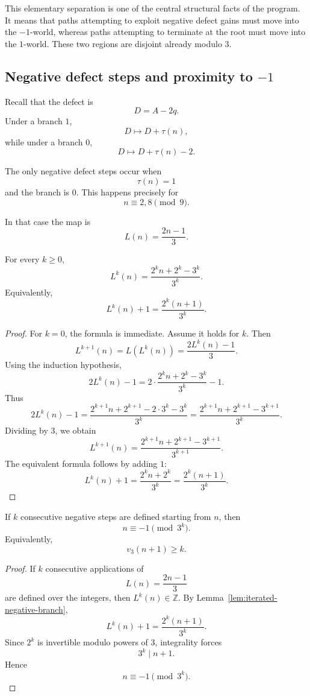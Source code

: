 This elementary separation is one of the central structural facts of the
program. It means that paths attempting to exploit negative defect gains
must move into the \(-1\)-world, whereas paths attempting to terminate at
the root must move into the \(1\)-world. These two regions are disjoint
already modulo \(3\).

\subsection{Negative defect steps and proximity to \(-1\)}
\label{subsec:negative-runs}

Recall that the defect is
\[
D=A-2q.
\]
Under a branch \(1\),
\[
D\mapsto D+\tau(n),
\]
while under a branch \(0\),
\[
D\mapsto D+\tau(n)-2.
\]

The only negative defect steps occur when
\[
\tau(n)=1
\]
and the branch is \(0\). This happens precisely for
\[
n\equiv2,8\pmod9.
\]

In that case the map is
\[
L(n)=\frac{2n-1}{3}.
\]

\begin{lemma}
\label{lem:iterated-negative-branch}
For every \(k\ge0\),
\[
L^k(n)
=
\frac{2^k n+2^k-3^k}{3^k}.
\]
Equivalently,
\[
L^k(n)+1
=
\frac{2^k(n+1)}{3^k}.
\]
\end{lemma}

\begin{proof}
For \(k=0\), the formula is immediate. Assume it holds for \(k\). Then
\[
L^{k+1}(n)
=
L(L^k(n))
=
\frac{2L^k(n)-1}{3}.
\]
Using the induction hypothesis,
\[
2L^k(n)-1
=
2\cdot
\frac{2^k n+2^k-3^k}{3^k}
-1.
\]
Thus
\[
2L^k(n)-1
=
\frac{2^{k+1}n+2^{k+1}-2\cdot3^k-3^k}{3^k}
=
\frac{2^{k+1}n+2^{k+1}-3^{k+1}}{3^k}.
\]
Dividing by \(3\), we obtain
\[
L^{k+1}(n)
=
\frac{2^{k+1}n+2^{k+1}-3^{k+1}}{3^{k+1}}.
\]
The equivalent formula follows by adding \(1\):
\[
L^k(n)+1
=
\frac{2^k n+2^k}{3^k}
=
\frac{2^k(n+1)}{3^k}.
\]
\end{proof}

\begin{lemma}
\label{lem:negative-runs-force-minus-one}
If \(k\) consecutive negative steps are defined starting from \(n\), then
\[
n\equiv -1\pmod{3^k}.
\]
Equivalently,
\[
v_3(n+1)\ge k.
\]
\end{lemma}

\begin{proof}
If \(k\) consecutive applications of
\[
L(n)=\frac{2n-1}{3}
\]
are defined over the integers, then \(L^k(n)\in\mathbb Z\). By
Lemma~\ref{lem:iterated-negative-branch},
\[
L^k(n)+1
=
\frac{2^k(n+1)}{3^k}.
\]
Since \(2^k\) is invertible modulo powers of \(3\), integrality forces
\[
3^k\mid n+1.
\]
Hence
\[
n\equiv -1\pmod{3^k}.
\]
\end{proof}

